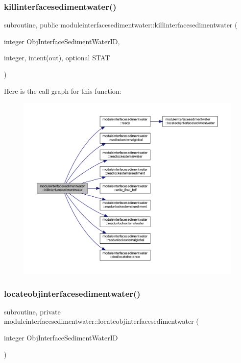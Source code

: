 \subsubsection{\texorpdfstring{killinterfacesedimentwater()}{killinterfacesedimentwater()}}
{\footnotesize\ttfamily subroutine, public moduleinterfacesedimentwater\+::killinterfacesedimentwater (\begin{DoxyParamCaption}\item[{integer}]{Obj\+Interface\+Sediment\+Water\+ID,  }\item[{integer, intent(out), optional}]{S\+T\+AT }\end{DoxyParamCaption})}

Here is the call graph for this function\+:\nopagebreak
\begin{figure}[H]
\begin{center}
\leavevmode
\includegraphics[width=350pt]{namespacemoduleinterfacesedimentwater_a692292c5eb96b9de096ef130fafc0962_cgraph}
\end{center}
\end{figure}
\mbox{\label{namespacemoduleinterfacesedimentwater_a299f7798fddc9b92224d7bf9ec6785c0}} 
\subsubsection{\texorpdfstring{locateobjinterfacesedimentwater()}{locateobjinterfacesedimentwater()}}
{\footnotesize\ttfamily subroutine, private moduleinterfacesedimentwater\+::locateobjinterfacesedimentwater (\begin{DoxyParamCaption}\item[{integer}]{Obj\+Interface\+Sediment\+Water\+ID }\end{DoxyParamCaption})\hspace{0.3cm}{\ttfamily [private]}}

